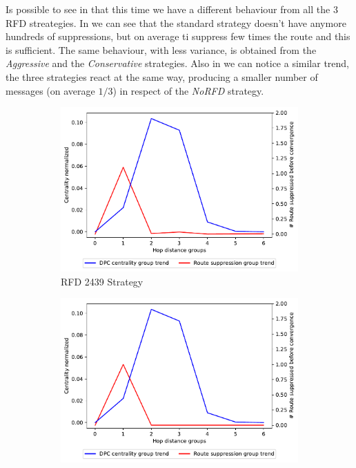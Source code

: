 Is possible to see in  that this time we have
a different behaviour from all the \num{3} \ac{RFD} streategies.
In  we can see that the
standard strategy doesn't have anymore hundreds of suppressions, but on average
ti suppress few times the route and this is sufficient.
The same behaviour, with less variance, is obtained from the \textit{Aggressive}
and the \textit{Conservative} strategies.
Also in 
we can notice a similar trend, the three strategies react at the same way,
producing a smaller number of messages (on average $1/3$) in respect of the 
\textit{NoRFD} strategy.

\begin{figure}[H]
     \centering
     \begin{subfigure}[b]{0.325\textwidth}
         \centering
         \includegraphics[width=\textwidth]{images/RFD/miceVSelephants/elephants/cisco_1000_RFD_nodeConvergence_centVSsup_trend.pdf}
         \caption{RFD 2439 Strategy}
         \label{fig:1000_2439RFD_centVSsup_elephants}
     \end{subfigure}
     \hfill
     \begin{subfigure}[b]{0.325\textwidth}
         \centering
         \includegraphics[width=\textwidth]{images/RFD/miceVSelephants/elephants/cisco_1000_RFD_7196_aggressive_nodeConvergence_centVSsup_trend.pdf}

\end{subfigure}
\end{figure}
